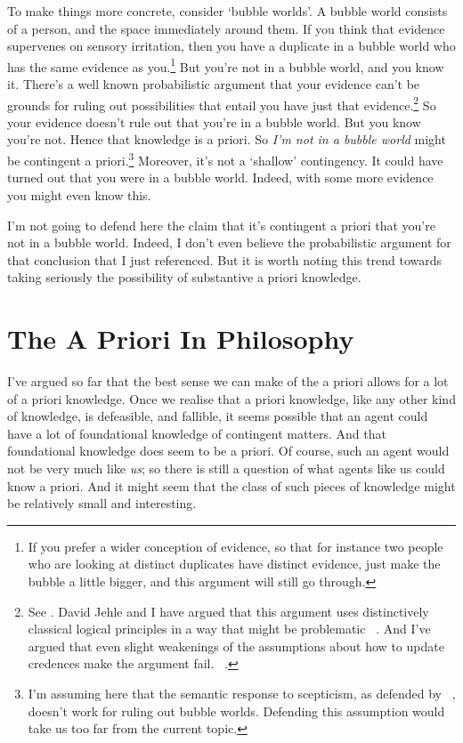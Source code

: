 To make things more concrete, consider `bubble worlds'. A bubble world consists of a person, and the space immediately around them. If you think that evidence supervenes on sensory irritation, then you have a duplicate in a bubble world who has the same evidence as you.\footnote{If you prefer a wider conception of evidence, so that for instance two people who are looking at distinct duplicates have distinct evidence, just make the bubble a little bigger, and this argument will still go through.} But you're not in a bubble world, and you know it. There's a well known probabilistic argument that your evidence can't be grounds for ruling out possibilities that entail you have just that evidence.\footnote{See  \citet{White2006}. David Jehle and I have argued that this argument uses distinctively classical logical principles in a way that might be problematic ~\citep{JehleWeatherson}. And I've argued that even slight weakenings of the assumptions about how to update credences make the argument fail. ~\citep{Weatherson2007}.} So your evidence doesn't rule out that you're in a bubble world. But you know you're not. Hence that knowledge is a priori. So \emph{I'm not in a bubble world} might be contingent a priori.\footnote{I'm assuming here that the semantic response to scepticism, as defended by ~\citep{Putnam1981}, doesn't work for ruling out bubble worlds. Defending this assumption would take us too far from the current topic.} Moreover, it's not a `shallow' contingency. It could have turned out that you were in a bubble world. Indeed, with some more evidence you might even know this.

I'm not going to defend here the claim that it's contingent a priori that you're not in a bubble world. Indeed, I don't even believe the probabilistic argument for that conclusion that I just referenced. But it is worth noting this trend towards taking seriously the possibility of substantive a priori knowledge.

\section{The A Priori In Philosophy}
\label{theaprioriinphilosophy}

I've argued so far that the best sense we can make of the a priori allows for a lot of a priori knowledge. Once we realise that a priori knowledge, like any other kind of knowledge, is defeasible, and fallible, it seems possible that an agent could have a lot of foundational knowledge of contingent matters. And that foundational knowledge does seem to be a priori. Of course, such an agent would not be very much like \emph{us}; so there is still a question of what agents like us could know a priori. And it might seem that the class of such pieces of knowledge might be relatively small and interesting.

